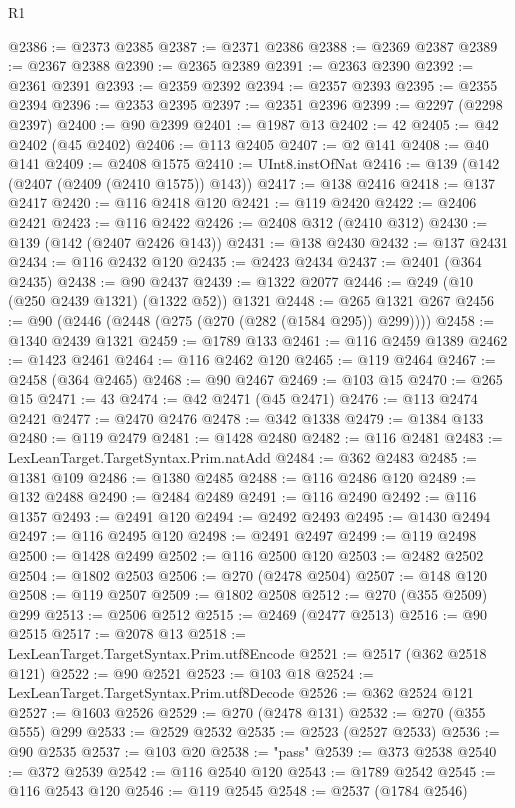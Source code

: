\begin{lexlean}{R1}
\begin{coremodule}
@2386 := @2373 @2385
@2387 := @2371 @2386
@2388 := @2369 @2387
@2389 := @2367 @2388
@2390 := @2365 @2389
@2391 := @2363 @2390
@2392 := @2361 @2391
@2393 := @2359 @2392
@2394 := @2357 @2393
@2395 := @2355 @2394
@2396 := @2353 @2395
@2397 := @2351 @2396
@2399 := @2297 (@2298 @2397)
@2400 := @90 @2399
@2401 := @1987 @13
@2402 := 42
@2405 := @42 @2402 (@45 @2402)
@2406 := @113 @2405
@2407 := @2 @141
@2408 := @40 @141
@2409 := @2408 @1575
@2410 := UInt8.instOfNat
@2416 := @139 (@142 (@2407 (@2409 (@2410 @1575)) @143))
@2417 := @138 @2416
@2418 := @137 @2417
@2420 := @116 @2418 @120
@2421 := @119 @2420
@2422 := @2406 @2421
@2423 := @116 @2422
@2426 := @2408 @312 (@2410 @312)
@2430 := @139 (@142 (@2407 @2426 @143))
@2431 := @138 @2430
@2432 := @137 @2431
@2434 := @116 @2432 @120
@2435 := @2423 @2434
@2437 := @2401 (@364 @2435)
@2438 := @90 @2437
@2439 := @1322 @2077
@2446 := @249 (@10 (@250 @2439 @1321) (@1322 @52)) @1321
@2448 := @265 @1321 @267
@2456 := @90 (@2446 (@2448 (@275 (@270 (@282 (@1584 @295)) @299))))
@2458 := @1340 @2439 @1321
@2459 := @1789 @133
@2461 := @116 @2459 @1389
@2462 := @1423 @2461
@2464 := @116 @2462 @120
@2465 := @119 @2464
@2467 := @2458 (@364 @2465)
@2468 := @90 @2467
@2469 := @103 @15
@2470 := @265 @15
@2471 := 43
@2474 := @42 @2471 (@45 @2471)
@2476 := @113 @2474 @2421
@2477 := @2470 @2476
@2478 := @342 @1338
@2479 := @1384 @133
@2480 := @119 @2479
@2481 := @1428 @2480
@2482 := @116 @2481
@2483 := LexLeanTarget.TargetSyntax.Prim.natAdd
@2484 := @362 @2483
@2485 := @1381 @109
@2486 := @1380 @2485
@2488 := @116 @2486 @120
@2489 := @132 @2488
@2490 := @2484 @2489
@2491 := @116 @2490
@2492 := @116 @1357
@2493 := @2491 @120
@2494 := @2492 @2493
@2495 := @1430 @2494
@2497 := @116 @2495 @120
@2498 := @2491 @2497
@2499 := @119 @2498
@2500 := @1428 @2499
@2502 := @116 @2500 @120
@2503 := @2482 @2502
@2504 := @1802 @2503
@2506 := @270 (@2478 @2504)
@2507 := @148 @120
@2508 := @119 @2507
@2509 := @1802 @2508
@2512 := @270 (@355 @2509) @299
@2513 := @2506 @2512
@2515 := @2469 (@2477 @2513)
@2516 := @90 @2515
@2517 := @2078 @13
@2518 := LexLeanTarget.TargetSyntax.Prim.utf8Encode
@2521 := @2517 (@362 @2518 @121)
@2522 := @90 @2521
@2523 := @103 @18
@2524 := LexLeanTarget.TargetSyntax.Prim.utf8Decode
@2526 := @362 @2524 @121
@2527 := @1603 @2526
@2529 := @270 (@2478 @131)
@2532 := @270 (@355 @555) @299
@2533 := @2529 @2532
@2535 := @2523 (@2527 @2533)
@2536 := @90 @2535
@2537 := @103 @20
@2538 := "pass"
@2539 := @373 @2538
@2540 := @372 @2539
@2542 := @116 @2540 @120
@2543 := @1789 @2542
@2545 := @116 @2543 @120
@2546 := @119 @2545
@2548 := @2537 (@1784 @2546)

\end{coremodule}
\end{lexlean}
